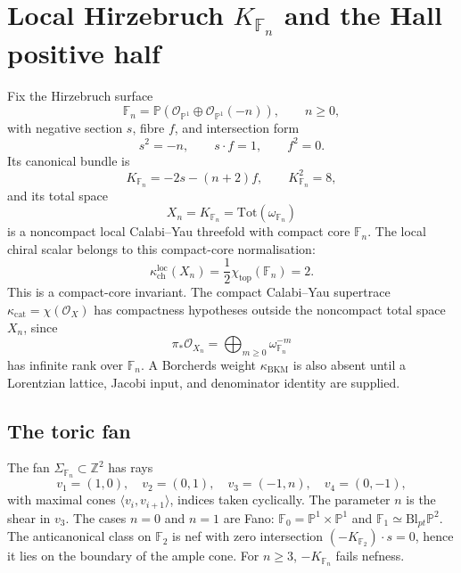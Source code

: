 \providecommand{\P}{\mathbb{P}}
\providecommand{\C}{\mathbb{C}}
\providecommand{\Z}{\mathbb{Z}}
\providecommand{\F}{\mathbb{F}}
\providecommand{\cO}{\mathcal{O}}
\providecommand{\cH}{\mathcal{H}}
\providecommand{\fgl}{\mathfrak{gl}}
\providecommand{\fsl}{\mathfrak{sl}}
\providecommand{\CoHA}{\mathrm{CoHA}}
\providecommand{\Tot}{\mathrm{Tot}}
\providecommand{\Crit}{\mathrm{Crit}}
\providecommand{\tr}{\mathrm{tr}}
\providecommand{\Spec}{\mathrm{Spec}}
\providecommand{\Coh}{\mathrm{Coh}}
\providecommand{\End}{\mathrm{End}}
\providecommand{\Hom}{\mathrm{Hom}}
\providecommand{\Jac}{\mathrm{Jac}}
\providecommand{\Pic}{\mathrm{Pic}}
\providecommand{\Hilb}{\mathrm{Hilb}}

\section*{Local Hirzebruch $K_{\F_n}$ and the Hall positive half}
\label{sec:local-hirzebruch-yplus}

Fix the Hirzebruch surface
\[
 \F_n=\P(\cO_{\P^1}\oplus\cO_{\P^1}(-n)),\qquad n\geq0,
\]
with negative section \(s\), fibre \(f\), and intersection form
\[
 s^2=-n,\qquad s\cdot f=1,\qquad f^2=0.
\]
Its canonical bundle is
\[
 K_{\F_n}=-2s-(n+2)f,\qquad K_{\F_n}^2=8,
\]
and its total space
\[
 X_n=K_{\F_n}=\Tot(\omega_{\F_n})
\]
is a noncompact local Calabi--Yau threefold with compact core
\(\F_n\). The local chiral scalar belongs to this compact-core
normalisation:
\[
 \kappa_{\mathrm{ch}}^{\mathrm{loc}}(X_n)
 =\frac{1}{2}\chi_{\mathrm{top}}(\F_n)=2.
\]
This is a compact-core invariant. The compact Calabi--Yau
supertrace \(\kappa_{\mathrm{cat}}=\chi(\cO_X)\) has compactness
hypotheses outside the noncompact total space \(X_n\), since
\[
 \pi_*\cO_{X_n}=\bigoplus_{m\geq0}\omega_{\F_n}^{-m}
\]
has infinite rank over \(\F_n\). A Borcherds weight
\(\kappa_{\mathrm{BKM}}\) is also absent until a Lorentzian lattice,
Jacobi input, and denominator identity are supplied.

\subsection*{The toric fan}

The fan \(\Sigma_{\F_n}\subset\Z^2\) has rays
\[
 v_1=(1,0),\quad v_2=(0,1),\quad v_3=(-1,n),\quad v_4=(0,-1),
\]
with maximal cones \(\langle v_i,v_{i+1}\rangle\), indices taken
cyclically. The parameter \(n\) is the shear in \(v_3\). The cases
\(n=0\) and \(n=1\) are Fano:
\(\F_0=\P^1\times\P^1\) and
\(\F_1\simeq\mathrm{Bl}_{pt}\P^2\). The anticanonical class on
\(\F_2\) is nef with zero intersection \((-K_{\F_2})\cdot s=0\), hence
it lies on the boundary of the ample cone. For \(n\geq3\),
\(-K_{\F_n}\) fails nefness.

